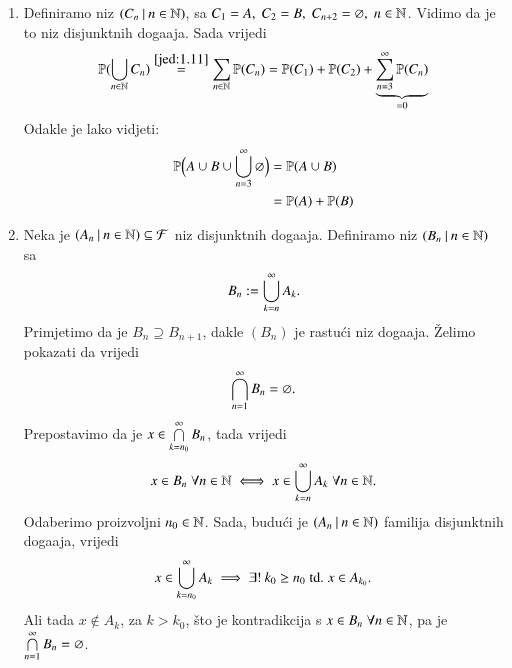 \begin{rj}[\ref{zad:1.12}]
    \begin{enumerate}[label=(\alph*)]
        \item Definiramo niz $({C_n} \: | \: {n \in \mathbb{N}})$, sa $C_1 = A, \; C_2 = B, \; C_{n + 2} = \varnothing, \; n \in \mathbb{N}$.
            Vidimo da je to niz disjunktnih doga\dj aja.
            Sada vrijedi
            \begin{equation*}
                \mathbb{P}({\bigcup\limits_{n \in \mathbb{N}}^{} C_n}) \overset{\eqref{jed:1.11}}{=} \sum\limits_{n \in \mathbb{N}}^{} \mathbb{P}({C_n}) = \mathbb{P}({C_1}) + \mathbb{P}({C_2}) + \underbrace{\sum\limits_{n = 3}^{\infty} \mathbb{P}({C_n})}_{=0}
            \end{equation*}
            Odakle je lako vidjeti:
            \begin{align*}
                \mathbb{P} \Big( A \cup B \cup \bigcup\limits_{n = 3}^{\infty} \varnothing \Big) &= \mathbb{P}({A \cup B}) \\
                &= \mathbb{P}({A}) + \mathbb{P}({B})
            \end{align*}
        \item Neka je $({A_n} \: | \: {n \in \mathbb{N}}) \subseteq \mathcal{F}$ niz disjunktnih doga\dj aja.
        Definiramo niz $({B_n} \: | \: {n \in \mathbb{N}})$ sa
        \begin{equation*}
            B_n := \bigcup\limits_{k = n}^{\infty} A_k.
        \end{equation*}
        Primjetimo da je $B_n \supseteq B_{n + 1}$, dakle $(B_n)$ je rastu\' ci niz doga\dj aja.
        \v Zelimo pokazati da vrijedi
        \begin{equation*}
            \bigcap\limits_{n = 1}^{\infty} B_n = \varnothing.
        \end{equation*}
        Prepostavimo da je $x \in \bigcap\limits_{k = n_0}^{\infty} B_n$, tada vrijedi
        \begin{equation*}
            x \in B_n \; \forall n \in \mathbb{N} \iff x \in \bigcup\limits_{k = n}^{\infty} A_k \; \forall n \in \mathbb{N}.
        \end{equation*}
        Odaberimo proizvoljni $n_0 \in \mathbb{N}$.
        Sada, budu\' ci je $({A_n} \: | \: {n \in \mathbb{N}})$ familija disjunktnih doga\dj aja, vrijedi
        \begin{equation*}
            x \in \bigcup\limits_{k = n_0}^{\infty} A_k \implies \exists ! \: k_0 \geq n_0 \; \mathrm{td.} \; x \in A_{k_0}.
        \end{equation*}
        Ali tada $x \notin A_k$, za $k > k_0$, \v sto je kontradikcija s $x \in B_n \; \forall n \in \mathbb{N}$, pa je $\bigcap\limits_{n = 1}^{\infty} B_n = \varnothing$.\\

\end{enumerate}
\end{rj}
